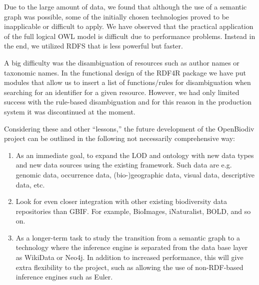 Due to the large amount of data, we found that although the use of a semantic graph was possible, some of the initially chosen technologies proved to be inapplicable or difficult to apply. We have observed that the practical application of the full logical OWL model is difficult due to performance problems. Instead in the end, we utilized RDFS that is less powerful but faster.

A big difficulty was the disambiguation of resources such as author names or taxonomic names. In the functional design of the RDF4R package we have put modules that allow us to insert a list of functions/rules for disambiguation when searching for an identifier for a given resource. However, we had only limited success with the rule-based disambiguation and for this reason in the production system it was discontinued at the moment.

Considering these and other ``lessons,'' the future development of the OpenBiodiv project can be outlined in the following not necessarily comprehensive way:

\begin{enumerate}
    \item As an immediate goal, to expand the LOD and ontology with new data types and new data sources using the existing framework. Such data are e.g. genomic data, occurrence data, (bio-)geographic data, visual data, descriptive data, etc.
    \item Look for even closer integration with other existing biodiversity data repositories than GBIF. For example, BioImages, iNaturalist, BOLD, and so on.
    \item As a longer-term task to study the transition from a semantic graph to a technology where the inference engine is separated from the data base layer as WikiData or Neo4j. In addition to increased performance, this will give extra flexibility to the project, such as allowing the use of non-RDF-based inference engines such as Euler.
\end{enumerate}
